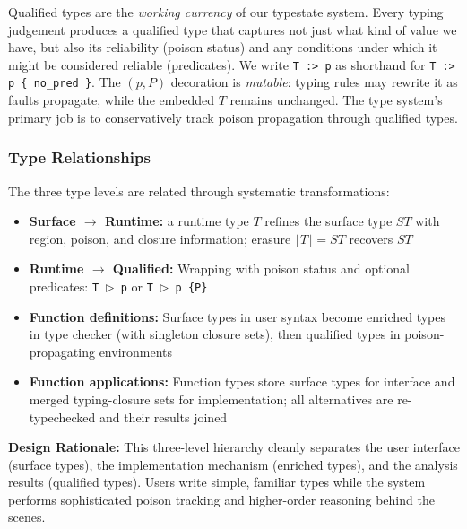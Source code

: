 \documentclass[12pt]{article}
\begin{document}
Qualified types are the \emph{working currency} of our typestate system. Every
typing judgement produces a qualified type that captures not just what kind of
value we have, but also its reliability (poison status) and any conditions under
which it might be considered reliable (predicates). We write \texttt{T :> p} as
shorthand for \texttt{T :> p \{ no\_pred \}}. The $(p,P)$ decoration is
\emph{mutable}: typing rules may rewrite it as faults propagate, while the
embedded $T$ remains unchanged. The type system's primary job is to
conservatively track poison propagation through qualified types.

\subsubsection{Type Relationships}

The three type levels are related through systematic transformations:

\begin{itemize}
    \item \textbf{Surface $\to$ Runtime:} a runtime type $T$ refines the surface type $ST$ with region, poison, and closure information; erasure $\lfloor T \rfloor = ST$ recovers $ST$
    \item \textbf{Runtime $\to$ Qualified:} Wrapping with poison status and optional predicates: \texttt{T $\triangleright$ p} or \texttt{T $\triangleright$ p \{P\}}
    \item \textbf{Function definitions:} Surface types in user syntax become enriched types in type checker (with singleton closure sets), then qualified types in poison-propagating environments
    \item \textbf{Function applications:} Function types store surface types for interface and merged typing-closure sets for implementation; all alternatives are re-typechecked and their results joined
\end{itemize}

\textbf{Design Rationale:} This three-level hierarchy cleanly separates the user
interface (surface types), the implementation mechanism (enriched types), and the
analysis results (qualified types). Users write simple, familiar types while the
system performs sophisticated poison tracking and higher-order reasoning behind
the scenes.
\end{document}
